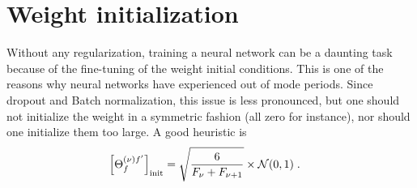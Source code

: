 \section{Weight initialization}

Without any regularization, training a neural network can be a daunting task because of the fine-tuning of the weight initial conditions. This is one of the reasons why neural networks have experienced out of mode periods. Since dropout and Batch normalization, this issue is less pronounced, but one should not initialize the weight in a symmetric fashion (all zero for instance), nor should one initialize them too large. A good heuristic is
\begin{align}
\left[\Theta^{(\nu)f'}_f\right]_{{\rm init}}&=\sqrt{\frac{6}{F_\nu+F_{\nu+1}}}\times\mathcal{N}(0,1)\;.
\end{align}

